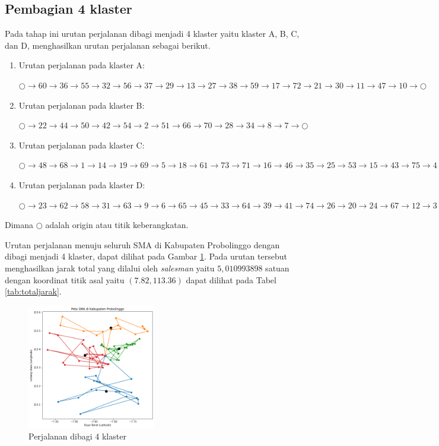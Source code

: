\subsection{Pembagian 4 klaster}

Pada tahap ini urutan perjalanan dibagi menjadi 4 klaster yaitu klaster A, B, C, dan D, menghasilkan urutan perjalanan sebagai berikut.

\begin{enumerate}

\item Urutan perjalanan pada klaster A:

$\bigcirc \to 60 \to 36 \to 55 \to 32 \to 56 \to 37 \to 29 \to 13 \to 27 \to 38 \to 59 \to 17 \to 72 \to 21 \to 30 \to 11 \to 47 \to 10 \to \bigcirc$

\item Urutan perjalanan pada klaster B:

$\bigcirc \to 22 \to 44 \to 50 \to 42 \to 54 \to 2 \to 51 \to 66 \to 70 \to 28 \to 34 \to 8 \to 7 \to \bigcirc$

\item Urutan perjalanan pada klaster C:

$\bigcirc \to 48 \to 68 \to 1 \to 14 \to 19 \to 69 \to 5 \to 18 \to 61 \to 73 \to 71 \to 16 \to 46 \to 35 \to 25 \to 53 \to 15 \to 43 \to 75 \to 4 \to 49 \to 40 \to 57 \to \bigcirc$

\item Urutan perjalanan pada klaster D:

$\bigcirc \to 23 \to 62 \to 58 \to 31 \to 63 \to 9 \to 6 \to 65 \to 45 \to 33 \to 64 \to 39 \to 41 \to 74 \to 26 \to 20 \to 24 \to 67 \to 12 \to 3 \to 52 \to \bigcirc$

\end{enumerate}

\noindent Dimana $\bigcirc$ adalah origin atau titik keberangkatan.

Urutan perjalanan menuju seluruh SMA di Kabupaten Probolinggo dengan dibagi menjadi 4 klaster, dapat dilihat pada Gambar \ref{fig:hasil_mtsp4}. Pada urutan tersebut menghasilkan jarak total yang dilalui oleh \textit{salesman} yaitu $5,010993898$ satuan dengan koordinat titik asal yaitu $(7.82, 113.36)$ dapat dilihat pada Tabel \ref{tab:totaljarak}.


\begin{figure}[H]
\centering
\includegraphics[width=0.5\textwidth]{Gambar/hasil_mtsp/4}
\caption{Perjalanan dibagi 4 klaster}
\label{fig:hasil_mtsp4}
\end{figure}

